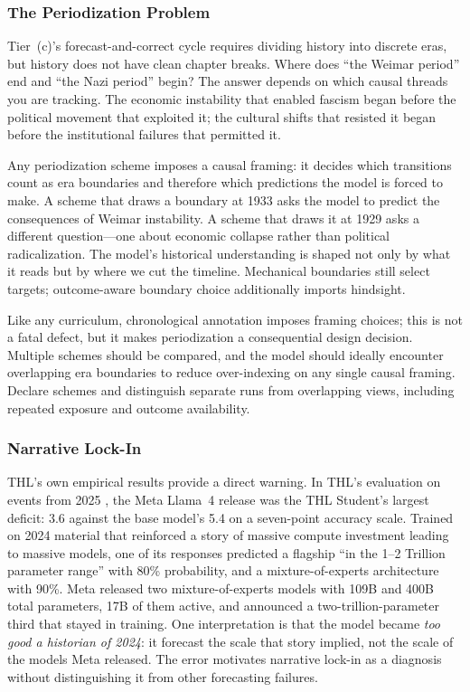 \documentclass[11pt]{article}
\begin{document}
\subsubsection{The Periodization Problem}

Tier~(c)'s forecast-and-correct cycle requires dividing history into discrete eras, but history does not have clean chapter breaks. Where does ``the Weimar period'' end and ``the Nazi period'' begin? The answer depends on which causal threads you are tracking. The economic instability that enabled fascism began before the political movement that exploited it; the cultural shifts that resisted it began before the institutional failures that permitted it.

Any periodization scheme imposes a causal framing: it decides which transitions count as era boundaries and therefore which predictions the model is forced to make. A scheme that draws a boundary at 1933 asks the model to predict the consequences of Weimar instability. A scheme that draws it at 1929 asks a different question---one about economic collapse rather than political radicalization. The model's historical understanding is shaped not only by what it reads but by where we cut the timeline. Mechanical boundaries still select targets; outcome-aware boundary choice additionally imports hindsight.

Like any curriculum, chronological annotation imposes framing choices; this is
not a fatal defect, but it makes periodization a consequential design decision.
Multiple schemes should be compared, and the model should ideally encounter
overlapping era boundaries to reduce over-indexing on any single causal framing. Declare schemes and distinguish separate runs from overlapping views, including repeated exposure and outcome availability.

\subsubsection{Narrative Lock-In}

THL's own empirical results provide a direct warning. In THL's evaluation on events from 2025 \cite{westerberg2026thl}, the Meta Llama~4 release was the THL Student's largest deficit: 3.6 against the base model's 5.4 on a seven-point accuracy scale. Trained on 2024 material that reinforced a story of massive compute investment leading to massive models, one of its responses predicted a flagship ``in the 1--2 Trillion parameter range'' with 80\% probability, and a mixture-of-experts architecture with 90\%. Meta released two mixture-of-experts models with 109B and 400B total parameters, 17B of them active, and announced a two-trillion-parameter third that stayed in training. One interpretation is that the model became \emph{too good a historian of 2024}: it forecast the scale that story implied, not the scale of the models Meta released. The error motivates narrative lock-in as a diagnosis without distinguishing it from other forecasting failures.
\end{document}
